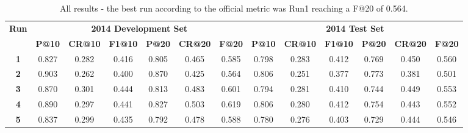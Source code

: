 
\begin{table*}[hbt]
\scriptsize
\centering
\caption{All results - the best run according to the official metric was Run1 reaching a F@20 of 0.564.}
\label{table:results}
\begin{tabular}{c|c|c|c|c|c|c|c|c|c|c|c|c}
\toprule 
\multirow{2}{*}{\textbf{Run}} & \multicolumn{6}{c|}{\textbf{2014 Development Set}} & \multicolumn{6}{c}{\textbf{2014 Test Set}}\tabularnewline
\cmidrule{2-13} 
 & \textbf{P@10} & \textbf{CR@10} & \textbf{F1@10} & \textbf{P@20} & \textbf{CR@20} & \textbf{F@20} & \textbf{P@10} & \textbf{CR@10} & \textbf{F1@10} & \textbf{P@20} & \textbf{CR@20} & \textbf{F@20}\tabularnewline
\midrule
\textbf{1} & 0.827 & 0.282 & 0.416 & 0.805 & 0.465 & 0.585 & 0.798 & 0.283  & 0.412  & 0.769  & 0.450  & 0.560 \tabularnewline
\textbf{2} & 0.903 & 0.262 & 0.400 & 0.870 & 0.425 & 0.564 & 0.806 & 0.251  & 0.377  & 0.773  & 0.381  & 0.501 \tabularnewline
\textbf{3} & 0.870 & 0.301 & 0.444 & 0.813 & 0.483 & 0.601 & 0.794 & 0.281  & 0.410  & 0.744  & 0.449  & 0.553 \tabularnewline
\textbf{4} & 0.890 & 0.297 & 0.441 & 0.827 & 0.503 & 0.619 & 0.806 & 0.280 & 0.412 & 0.754  & 0.443 &  0.552   \tabularnewline
\textbf{5} & 0.837 & 0.299 & 0.435 & 0.792 & 0.478 & 0.588 & 0.780 & 0.276 & 0.403 & 0.729 & 0.444 &  0.546    \tabularnewline
\bottomrule 
\end{tabular}
\end{table*}


